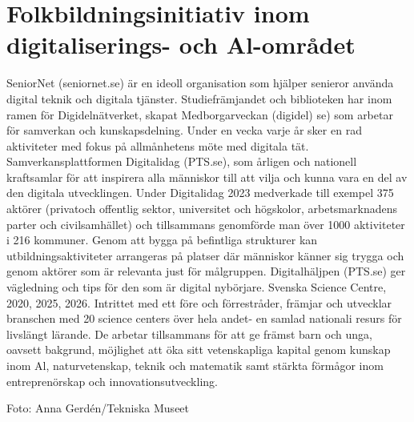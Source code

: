 {{{{{{{{\section*{Folkbildningsinitiativ inom digitaliserings- och Al-området}
SeniorNet (seniornet.se) är en ideoll organisation som hjälper senieror använda digital teknik och digitala tjänster.
Studiefrämjandet och biblioteken har inom ramen för Digidelnätverket, skapat Medborgarveckan (digidel) se) som arbetar för samverkan och kunskapsdelning. Under en vecka varje år sker en rad aktiviteter med fokus på allmånhetens möte med digitala tät.
Samverkansplattformen Digitalidag (PTS.se), som årligen och nationell kraftsamlar för att inspirera alla människor till att vilja och kunna vara en del av den digitala utvecklingen. Under Digitalidag 2023 medverkade till exempel 375 aktörer (privatoch offentlig sektor, universitet och högskolor, arbetsmarknadens parter och civilsamhället) och tillsammans genomförde man över 1000 aktiviteter i 216 kommuner. Genom att bygga på befintliga strukturer kan utbildningsaktiviteter arrangeras på platser där människor känner sig trygga och genom aktörer som är relevanta just för målgruppen.
Digitalhäljpen (PTS.se) ger vägledning och tips för den som är digital nybörjare.
Svenska Science Centre, 2020, 2025, 2026.
Intrittet med ett före och förrestråder, främjar och utvecklar branschen med 20 science centers över hela andet- en samlad nationali resurs för livslängt lärande. De arbetar tillsammans för att ge främst barn och unga, oavsett bakgrund, möjlighet att öka sitt vetenskapliga kapital genom kunskap inom Al, naturvetenskap, teknik och matematik samt stärkta förmågor inom entreprenörskap och innovationsutveckling.

Foto: Anna Gerdén/Tekniska Museet

}}}}}}}}
